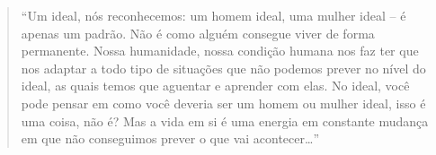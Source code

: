 

\cleartoverso

\begin{quote}
“Um ideal, nós reconhecemos: um homem ideal, uma mulher ideal – é apenas
um padrão. Não é como alguém consegue viver de forma permanente. Nossa
humanidade, nossa condição humana nos faz ter que nos adaptar a todo
tipo de situações que não podemos prever no nível do ideal, as quais
temos que aguentar e aprender com elas. No ideal, você pode pensar em
como você deveria ser um homem ou mulher ideal, isso é uma coisa, não
é? Mas a vida em si é uma energia em constante mudança em que não
conseguimos prever o que vai acontecer…”
\end{quote}


